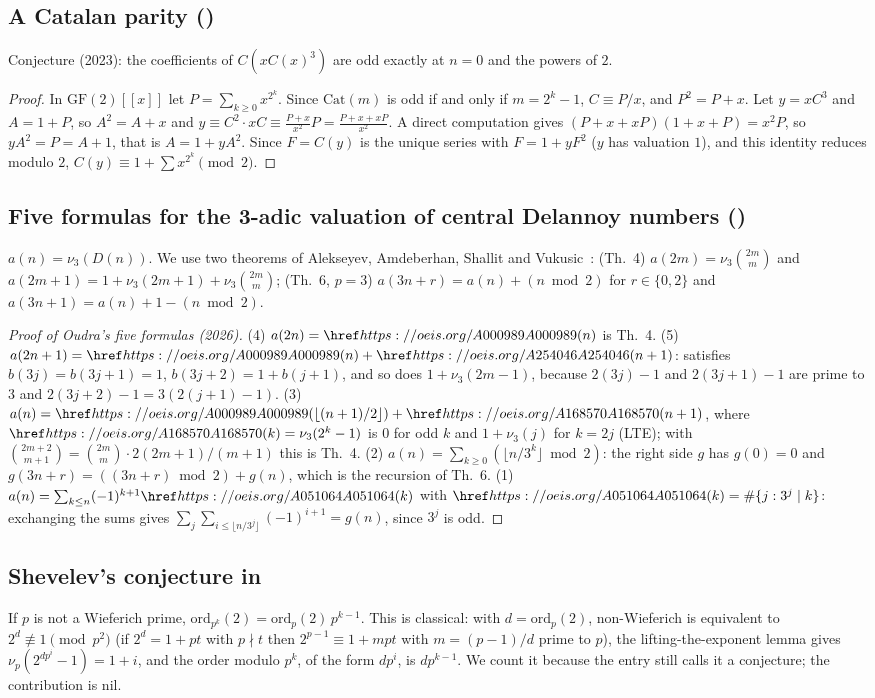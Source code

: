 \subsection{A Catalan parity ()}\label{s:A363308}
Conjecture (2023): the coefficients of $C(xC(x)^3)$ are odd exactly at $n=0$ and the powers of $2$.
\begin{proof} In $\mathrm{GF}(2)[[x]]$ let $P=\sum_{k\ge0}x^{2^k}$. Since $\mathrm{Cat}(m)$ is odd if and only if
$m=2^k-1$, $C\equiv P/x$, and $P^2=P+x$. Let $y=xC^3$ and $A=1+P$, so $A^2=A+x$ and
$y\equiv C^2\cdot xC\equiv\frac{P+x}{x^2}P=\frac{P+x+xP}{x^2}$. A direct computation gives $(P+x+xP)(1+x+P)=x^2P$,
so $yA^2=P=A+1$, that is $A=1+yA^2$. Since $F=C(y)$ is the unique series with $F=1+yF^2$ ($y$ has valuation $1$),
and this identity reduces modulo $2$, $C(y)\equiv1+\sum x^{2^k}\pmod2$. \end{proof}

\subsection{Five formulas for the 3-adic valuation of central Delannoy numbers ()}\label{s:A358360}
$a(n)=\nu_3(D(n))$. We use two theorems of Alekseyev, Amdeberhan, Shallit and Vukusic~\cite{AASV}: (Th.~4)
$a(2m)=\nu_3\binom{2m}m$ and $a(2m+1)=1+\nu_3(2m+1)+\nu_3\binom{2m}m$; (Th.~6, $p=3$) $a(3n+r)=a(n)+(n\bmod2)$ for
$r\in\{0,2\}$ and $a(3n+1)=a(n)+1-(n\bmod2)$.
\begin{proof}[Proof of Oudra's five formulas (2026)] (4) $a(2n)=\oeis{A000989}(n)$ is Th.~4. (5)
$a(2n+1)=\oeis{A000989}(n)+\oeis{A254046}(n+1)$:  satisfies $b(3j)=b(3j+1)=1$, $b(3j+2)=1+b(j+1)$, and so
does $1+\nu_3(2m-1)$, because $2(3j)-1$ and $2(3j+1)-1$ are prime to $3$ and $2(3j+2)-1=3(2(j+1)-1)$. (3)
$a(n)=\oeis{A000989}(\lfloor(n+1)/2\rfloor)+\oeis{A168570}(n+1)$, where $\oeis{A168570}(k)=\nu_3(2^k-1)$ is $0$ for odd
$k$ and $1+\nu_3(j)$ for $k=2j$ (LTE); with $\binom{2m+2}{m+1}=\binom{2m}m\cdot2(2m+1)/(m+1)$ this is Th.~4. (2)
$a(n)=\sum_{k\ge0}(\lfloor n/3^k\rfloor\bmod2)$: the right side $g$ has $g(0)=0$ and $g(3n+r)=((3n+r)\bmod2)+g(n)$, which
is the recursion of Th.~6. (1) $a(n)=\sum_{k\le n}(-1)^{k+1}\oeis{A051064}(k)$ with $\oeis{A051064}(k)=\#\{j:3^j\mid k\}$:
exchanging the sums gives $\sum_j\sum_{i\le\lfloor n/3^j\rfloor}(-1)^{i+1}=g(n)$, since $3^j$ is odd. \end{proof}

\subsection{Shevelev's conjecture in }\label{s:A014664}
If $p$ is not a Wieferich prime, $\mathrm{ord}_{p^k}(2)=\mathrm{ord}_p(2)\,p^{k-1}$. This is classical: with
$d=\mathrm{ord}_p(2)$, non-Wieferich is equivalent to $2^d\not\equiv1\pmod{p^2}$ (if $2^d=1+pt$ with $p\nmid t$ then
$2^{p-1}\equiv1+mpt$ with $m=(p-1)/d$ prime to $p$), the lifting-the-exponent lemma gives
$\nu_p(2^{dp^i}-1)=1+i$, and the order modulo $p^k$, of the form $dp^i$, is $dp^{k-1}$. We count it because the
entry still calls it a conjecture; the contribution is nil.

